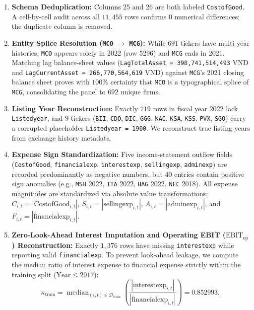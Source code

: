 \documentclass[11pt,a4paper]{article}
\begin{document}
\begin{enumerate}
    \item \textbf{Schema Deduplication:} Columns 25 and 26 are both labeled \texttt{CostofGood}. A cell-by-cell audit across all $11,455$ rows confirms $0$ numerical differences; the duplicate column is removed.
    \item \textbf{Entity Splice Resolution (\texttt{MCO} $\to$ \texttt{MCG}):} While $691$ tickers have multi-year histories, \texttt{MCO} appears solely in 2022 (row 5296) and \texttt{MCG} ends in 2021. Matching lag balance-sheet values (\texttt{LagTotalAsset = 398,741,514,493} VND and \texttt{LagCurrentAsset = 266,770,564,619} VND) against \texttt{MCG}'s 2021 closing balance sheet proves with $100\%$ certainty that \texttt{MCO} is a typographical splice of \texttt{MCG}, consolidating the panel to $692$ unique firms.
    \item \textbf{Listing Year Reconstruction:} Exactly $719$ rows in fiscal year 2022 lack \texttt{Listedyear}, and $9$ tickers (\texttt{BII}, \texttt{CDO}, \texttt{DIC}, \texttt{GGG}, \texttt{KAC}, \texttt{KSA}, \texttt{KSS}, \texttt{PVX}, \texttt{SGO}) carry a corrupted placeholder \texttt{Listedyear = 1900}. We reconstruct true listing years from exchange history metadata.
    \item \textbf{Expense Sign Standardization:} Five income-statement outflow fields (\texttt{CostofGood}, \texttt{financialexp}, \texttt{interestexp}, \texttt{sellingexp}, \texttt{adminexp}) are recorded predominantly as negative numbers, but $40$ entries contain positive sign anomalies (e.g., \texttt{MSH} 2022, \texttt{ITA} 2022, \texttt{HAG} 2022, \texttt{NFC} 2018). All expense magnitudes are standardized via absolute value transformations: $C_{i,t} = |\text{CostofGood}_{i,t}|$, $S_{i,t} = |\text{sellingexp}_{i,t}|$, $A_{i,t} = |\text{adminexp}_{i,t}|$, and $F_{i,t} = |\text{financialexp}_{i,t}|$.
    \item \textbf{Zero-Look-Ahead Interest Imputation and Operating EBIT ($\text{EBIT}_{\text{op}}$) Reconstruction:} Exactly $1,376$ rows have missing \texttt{interestexp} while reporting valid \texttt{financialexp}. To prevent look-ahead leakage, we compute the median ratio of interest expense to financial expense strictly within the training split ($\text{Year} \le 2017$):
    \begin{equation}
        \kappa_{\text{train}} = \operatorname{median}_{(i,t) \in \mathcal{D}_{\text{train}}} \left( \frac{|\text{interestexp}_{i,t}|}{|\text{financialexp}_{i,t}|} \right) = 0.852993,

\end{equation}
\end{enumerate}
\end{document}

